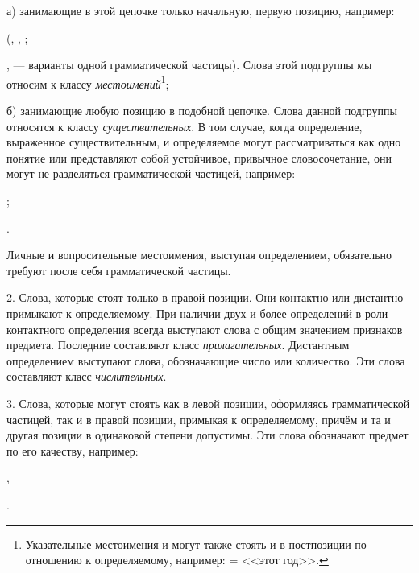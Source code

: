 а) занимающие в этой цепочке только начальную, первую позицию, например:
\begin{prfsample}
    \item {} (, , ;    
\end{prfsample}
,  --- варианты одной грамматической частицы). Слова этой подгруппы мы относим к классу \emph{местоимений}\footnote[24]{Указательные местоимения  и  могут также стоять и в постпозиции по отношению к определяемому, например:  =  <<этот год>>.};

б) занимающие любую позицию в подобной цепочке. Слова данной подгруппы относятся к классу \emph{существительных}. В том случае, когда определение, выраженное существительным, и определяемое могут рассматриваться как одно понятие или представляют собой устойчивое, привычное словосочетание, они могут не разделяться грамматической частицей, например:
\begin{prfsample}
    \item {};
    \item {}.    
\end{prfsample}
Личные и вопросительные местоимения, выступая определением, обязательно требуют после себя грамматической частицы.

2. Слова, которые стоят только в правой позиции. Они контактно или дистантно примыкают к определяемому. При наличии двух и более определений в роли контактного определения всегда выступают слова с общим значением признаков предмета. Последние составляют класс \emph{прилагательных}. Дистантным определением выступают слова, обозначающие число или количество. Эти слова составляют класс \emph{числительных}.

3. Слова, которые могут стоять как в левой позиции, оформляясь грамматической частицей, так и в правой позиции, примыкая к определяемому, причём и та и другая позиции в одинаковой степени допустимы. Эти слова обозначают предмет по его качеству, например:
\begin{prfsample}
    \item {},
    \item {}.    
\end{prfsample}

